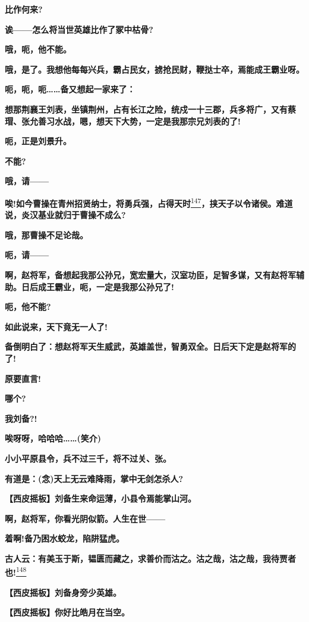 \textbf{比作何来?}

\textbf{诶------怎么将当世英雄比作了冢中枯骨?}

\textbf{哦，呃，他不能。}

\textbf{哦，是了。我想他每每兴兵，霸占民女，掳抢民财，鞭挞士卒，焉能成王霸业呀。}

\textbf{呃，呃，呃\ldots{}\ldots{}备又想起一家来了：}

\textbf{想那荆襄王刘表，坐镇荆州，占有长江之险，统戍一十三郡，兵多将广，又有蔡瑁、张允善习水战，嗯，想天下大势，一定是我那宗兄刘表的了!}

\textbf{呃，正是刘景升。}

\textbf{不能?}

\textbf{哦，请------}

\textbf{唉!如今曹操在青州招贤纳士，将勇兵强，占得天时}\protect\hyperlink{fn147}{\textsuperscript{147}}\textbf{，挟天子以令诸侯。难道说，炎汉基业就归于曹操不成么?}

\textbf{哦，那曹操不足论哉。}

\textbf{呃，请------}

\textbf{啊，赵将军，备想起我那公孙兄，宽宏量大，汉室功臣，足智多谋，又有赵将军辅助。日后成王霸业，呃，一定是我那公孙兄了!}

\textbf{呃，他不能?}

\textbf{如此说来，天下竟无一人了!}

\textbf{备倒明白了：想赵将军天生威武，英雄盖世，智勇双全。日后天下定是赵将军的了!}

\textbf{原要直言!}

\textbf{哪个?}

\textbf{我刘备?!}

\textbf{唉呀呀，哈哈哈\ldots{}\ldots{}(笑介)}

\textbf{小小平原县令，兵不过三千，将不过关、张。}

\textbf{有道是：(念)天上无云难降雨，掌中无剑怎杀人?}

\textbf{【西皮摇板】刘备生来命运薄，小县令焉能掌山河。}

\textbf{啊，赵将军，你看光阴似箭。人生在世------}

\textbf{着啊!备乃困水蛟龙，陷阱猛虎。}

\textbf{古人云：有美玉于斯，韫匮而藏之，求善价而沽之。沽之哉，沽之哉，我待贾者也!}\protect\hyperlink{fn148}{\textsuperscript{148}}

\textbf{【西皮摇板】刘备身旁少英雄。}

\textbf{【西皮摇板】你好比皓月在当空。}


